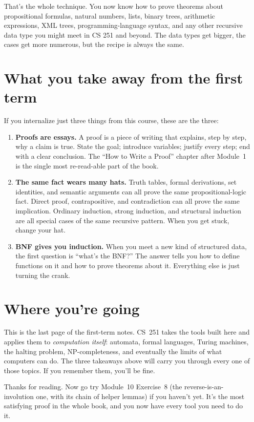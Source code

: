 \documentclass[11pt]{article}
\begin{document}
That's the whole technique. You now know how to prove theorems about propositional formulas, natural numbers, lists, binary trees, arithmetic expressions, XML trees, programming-language syntax, and any other recursive data type you might meet in CS 251 and beyond. The data types get bigger, the cases get more numerous, but the recipe is always the same.

\section*{What you take away from the first term}

If you internalize just three things from this course, these are the three:

\begin{enumerate}
  \item \textbf{Proofs are essays.} A proof is a piece of writing that explains, step by step, why a claim is true. State the goal; introduce variables; justify every step; end with a clear conclusion. The ``How to Write a Proof'' chapter after Module~1 is the single most re-read-able part of the book.

  \item \textbf{The same fact wears many hats.} Truth tables, formal derivations, set identities, and semantic arguments can all prove the same propositional-logic fact. Direct proof, contrapositive, and contradiction can all prove the same implication. Ordinary induction, strong induction, and structural induction are all special cases of the same recursive pattern. When you get stuck, change your hat.

  \item \textbf{BNF gives you induction.} When you meet a new kind of structured data, the first question is ``what's the BNF?'' The answer tells you how to define functions on it and how to prove theorems about it. Everything else is just turning the crank.
\end{enumerate}

\section*{Where you're going}

This is the last page of the first-term notes. CS~251 takes the tools built here and applies them to \emph{computation itself}: automata, formal languages, Turing machines, the halting problem, NP-completeness, and eventually the limits of what computers can do. The three takeaways above will carry you through every one of those topics. If you remember them, you'll be fine.

Thanks for reading. Now go try Module~10 Exercise~8 (the reverse-is-an-involution one, with its chain of helper lemmas) if you haven't yet. It's the most satisfying proof in the whole book, and you now have every tool you need to do it.
\end{document}
